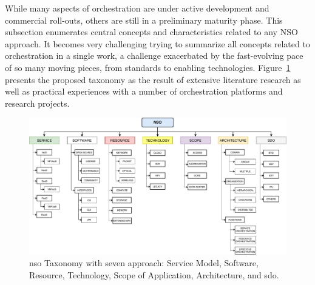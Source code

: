 While many aspects of orchestration are under active development and commercial roll-outs, others are still in a preliminary maturity phase. This subsection enumerates central concepts and characteristics related to any NSO approach. It becomes very challenging trying to summarize all concepts related to orchestration in a single work, a challenge exacerbated by the fast-evolving pace of so many moving pieces, from standards to enabling technologies. Figure~\ref{tax} presents the proposed taxonomy as the result of extensive literature research as well as practical experiences with a number of orchestration platforms and research projects.   

\begin{figure}[thpb]
  \centering
  \includegraphics[scale=.52]{Figures/04_NSO/fig_15.pdf}
    \caption{\gls{nso} Taxonomy with seven approach: Service Model, Software, Resource, Technology, Scope of Application, Architecture, and \acrfull{sdo}.}
    \label{tax}
\end{figure}

